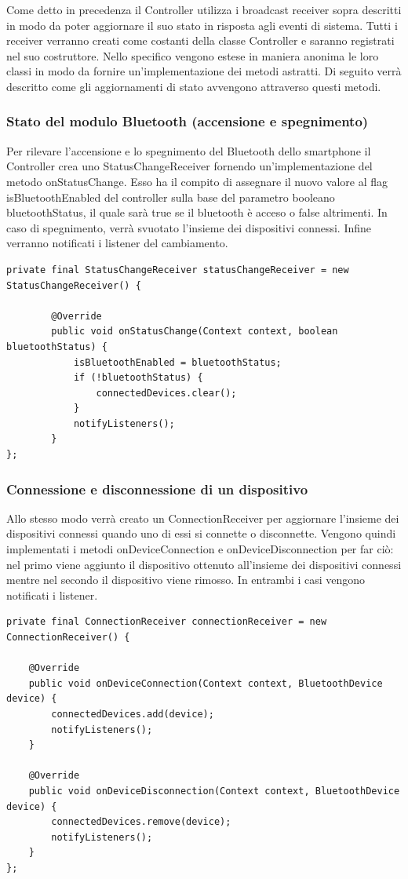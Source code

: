 Come detto in precedenza il Controller utilizza i broadcast receiver sopra descritti in modo da poter aggiornare il suo stato in risposta agli eventi di sistema. Tutti i receiver verranno creati come costanti della classe Controller e saranno registrati nel suo costruttore. Nello specifico vengono estese in maniera anonima le loro classi in modo da fornire un'implementazione dei metodi astratti. Di seguito verrà descritto come gli aggiornamenti di stato avvengono attraverso questi metodi.

\subsubsection{Stato del modulo Bluetooth (accensione e spegnimento)}
Per rilevare l'accensione e lo spegnimento del Bluetooth dello smartphone il Controller crea uno StatusChangeReceiver fornendo un'implementazione del metodo onStatusChange. Esso ha il compito di assegnare il nuovo valore al flag isBluetoothEnabled del controller sulla base del parametro booleano bluetoothStatus, il quale sarà true se il bluetooth è acceso o false altrimenti. In caso di spegnimento, verrà svuotato l'insieme dei dispositivi connessi. Infine verranno notificati i listener del cambiamento.
\begin{verbatim}
private final StatusChangeReceiver statusChangeReceiver = new StatusChangeReceiver() {

        @Override
        public void onStatusChange(Context context, boolean bluetoothStatus) {
            isBluetoothEnabled = bluetoothStatus;
            if (!bluetoothStatus) {
                connectedDevices.clear();
            }
            notifyListeners();
        }
};
\end{verbatim}

\subsubsection{Connessione e disconnessione di un dispositivo}
Allo stesso modo verrà creato un ConnectionReceiver per aggiornare l'insieme dei dispositivi connessi quando uno di essi si connette o disconnette. Vengono quindi implementati i metodi onDeviceConnection e onDeviceDisconnection per far ciò: nel primo viene aggiunto il dispositivo ottenuto all'insieme dei dispositivi connessi mentre nel secondo il dispositivo viene rimosso. In entrambi i casi vengono notificati i listener.
\begin{verbatim}
private final ConnectionReceiver connectionReceiver = new ConnectionReceiver() {

    @Override
    public void onDeviceConnection(Context context, BluetoothDevice device) {
        connectedDevices.add(device);
        notifyListeners();
    }

    @Override
    public void onDeviceDisconnection(Context context, BluetoothDevice device) {
        connectedDevices.remove(device);
        notifyListeners();
    }
};
\end{verbatim}

